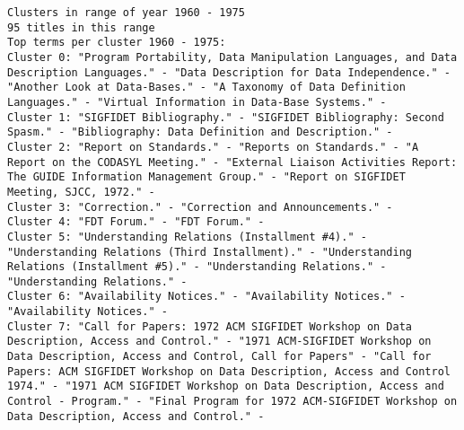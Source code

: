 \documentclass[11pt]{article}
\begin{document}
\begin{verbatim}
Clusters in range of year 1960 - 1975
95 titles in this range
Top terms per cluster 1960 - 1975:
Cluster 0: "Program Portability, Data Manipulation Languages, and Data Description Languages." - "Data Description for Data Independence." - "Another Look at Data-Bases." - "A Taxonomy of Data Definition Languages." - "Virtual Information in Data-Base Systems." - 
Cluster 1: "SIGFIDET Bibliography." - "SIGFIDET Bibliography: Second Spasm." - "Bibliography: Data Definition and Description." - 
Cluster 2: "Report on Standards." - "Reports on Standards." - "A Report on the CODASYL Meeting." - "External Liaison Activities Report: The GUIDE Information Management Group." - "Report on SIGFIDET Meeting, SJCC, 1972." - 
Cluster 3: "Correction." - "Correction and Announcements." - 
Cluster 4: "FDT Forum." - "FDT Forum." - 
Cluster 5: "Understanding Relations (Installment #4)." - "Understanding Relations (Third Installment)." - "Understanding Relations (Installment #5)." - "Understanding Relations." - "Understanding Relations." - 
Cluster 6: "Availability Notices." - "Availability Notices." - "Availability Notices." - 
Cluster 7: "Call for Papers: 1972 ACM SIGFIDET Workshop on Data Description, Access and Control." - "1971 ACM-SIGFIDET Workshop on Data Description, Access and Control, Call for Papers" - "Call for Papers: ACM SIGFIDET Workshop on Data Description, Access and Control 1974." - "1971 ACM SIGFIDET Workshop on Data Description, Access and Control - Program." - "Final Program for 1972 ACM-SIGFIDET Workshop on Data Description, Access and Control." - 



\end{verbatim}
\end{document}
